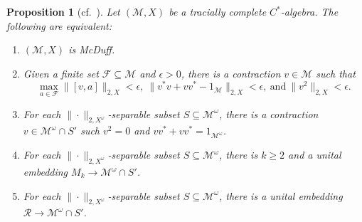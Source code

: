 \documentclass[a4paper,11pt]{amsart}
\newtheorem{proposition}[theorem]{Proposition}
\theoremstyle{definition}
\numberwithin{equation}{section}
\numberwithin{theorem}{section}
\newcommand{\R}{\mathcal R}
\newcommand{\M}{\mathcal{M}}
\begin{document}
\begin{proposition}[{cf.\ \cite[Proposition~3.11]{BBSTWW}}]\label{prop:McDuff}
Let $(\M,X)$ be a tracially complete $C^*$-algebra. The following are equivalent:
\begin{enumerate}[wide, labelwidth=0pt, labelindent=0pt]
  \item\label{item:McDuff} $(\M, X)$ is McDuff.
   \item\label{item:McDuff-approx} Given a finite set $\mathcal F \subseteq \M$ and $\epsilon > 0$, there is a contraction $v \in \M$ such that
   \begin{equation}
	  \max_{a \in \mathcal F} \|[v, a]\|_{2, X} < \epsilon,\ \|v^*v + vv^* -1_\mathcal M\|_{2, X} < \epsilon,\ \text{and}\ \|v^2\|_{2, X} < \epsilon.
   \end{equation}

   \item\label{item:v-reduced-product} For each $\|\cdot\|_{2, X^\omega}$-separable subset $S \subseteq \mathcal{M}^\omega$, there is a contraction $v \in \M^\omega \cap S'$ such $v^2 = 0$ and $vv^* + vv^* = 1_{\M^\omega}$.
   
   \item\label{item:approx-central-matrix} For each $\|\cdot\|_{2, X^\omega}$-separable subset $S \subseteq \mathcal{M}^\omega$, there is $k \geq 2$ and a unital embedding $M_k \rightarrow \M^\omega \cap S'$.
  
  \item\label{item:approx-central-R}For each $\|\cdot\|_{2, X^\omega}$-separable subset $S \subseteq \mathcal{M}^\omega$, there is a unital embedding $\R \rightarrow \M^\omega \cap S'$.
\end{enumerate}
\end{proposition}
\end{document}
